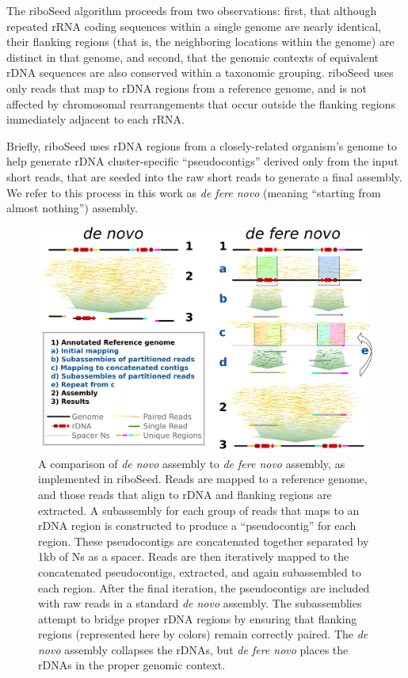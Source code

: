 \documentclass[a4,center,fleqn]{NAR}
\begin{document}
The riboSeed algorithm proceeds from two observations: first, that although repeated rRNA coding sequences within a single genome are nearly identical, their flanking regions (that is, the neighboring locations within the genome) are distinct in that genome, and second, that the genomic contexts of equivalent rDNA sequences are also conserved within a taxonomic grouping. riboSeed uses only reads that map to rDNA regions from a reference genome, and is not affected by chromosomal rearrangements that occur outside the flanking regions immediately adjacent to each rRNA.


Briefly, riboSeed uses rDNA regions from a closely-related organism's genome to help generate rDNA cluster-specific ``pseudocontigs'' derived only from the input short reads, that are seeded into the raw short reads to generate a final assembly. We refer to this process in this work as \textit{de fere novo} (meaning ``starting from almost nothing'') assembly.



\begin{figure}[t]
  \begin{center}
  \includegraphics[width=.85\textwidth]{riboSeed_v14}
  \end{center}
  \caption{A comparison of \textit{de novo} assembly to \textit{de fere novo} assembly, as implemented in riboSeed. Reads are mapped to a reference genome, and those reads that align to rDNA and flanking regions are extracted. A subassembly for each group of reads that maps to an rDNA region is constructed to produce a ``pseudocontig'' for each region. These pseudocontigs are concatenated together separated by 1kb of Ns as a spacer. Reads are then iteratively mapped to the concatenated pseudocontigs, extracted, and again subassembled to each region. After the final iteration, the pseudocontigs are included with raw reads in a standard \textit{de novo} assembly. The subassemblies attempt to bridge proper rDNA regions by ensuring that flanking regions (represented here by colors) remain correctly paired. The \textit{de novo} assembly collapses the rDNAs, but \textit{de fere novo} places the rDNAs in the proper genomic context.
  }
  \label{fig:overview}
\end{figure}
\end{document}
